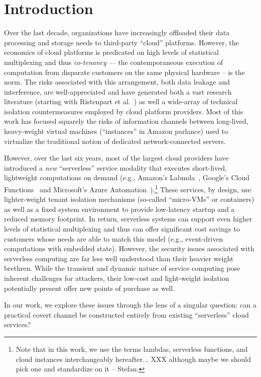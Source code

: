 \section{Introduction}
\label{sec:intro}

Over the last decade, organizations have increasingly offloaded their
data processing and storage needs to third-party ``cloud'' platforms.
However, the economics of cloud platforms is predicated on high levels
of statistical multiplexing and thus \emph{co-tenancy} --- the
contemporaneous execution of computation from disparate customers on
the same physical hardware -- is the norm.  The risks associated with
this arrangement, both data leakage and interference, are
well-appreciated and have generated both a vast research literature
(starting with Ristenpart et al.~\cite{ristenpartccs2009}) as well a
wide-array of technical isolation countermeasures employed by cloud
platform providers. Most of this work has focused squarely the risks
of information channels between long-lived, heavy-weight virtual
machines (``instances'' in Amazon parlance) used to virtualize the
traditional notion of dedicated network-connected servers.

However, over the last six years, most of the largest cloud providers
have introduced a \emph{new} ``serverless'' service modality that
executes short-lived, lightweight computations on demand (e.g.,
Amazon's Labmda~\cite{awslambda}, Google's Cloud
Functions~\cite{gcpfunctions} and Microsoft's Azure
Automation~\cite{azueautomation}).\footnote{Note that in this work, we
  use the terms lambdas, serverless functions, and cloud instances
  interchangeably hereafter... XXX although maybe we should pick one
  and standardize on it -- Stefan.} These services, by design, use
lighter-weight tenant isolation mechanisms (so-called ``micro-VMs'' or
containers) as well as a fixed system environment to provide
low-latency startup and a reduced memory footprint.  In return,
serverless systems can support even higher levels of statistical
multiplexing and thus can offer significant cost savings to customers
whose needs are able to match this model (e.g., event-driven
computations with embedded state).  However, the security issues
associated with serverless computing are far less well understood than
their heavier weight brethren.  While the transient and dynamic nature
of service computing pose inherent challenges for attackers, their
low-cost and light-weight isolation potentially present offer new
points of purchase as well.

In our work, we explore these issues through the lens of a singular
question: can a practical covert channel be constructed entirely from existing
``serverless'' cloud services?

